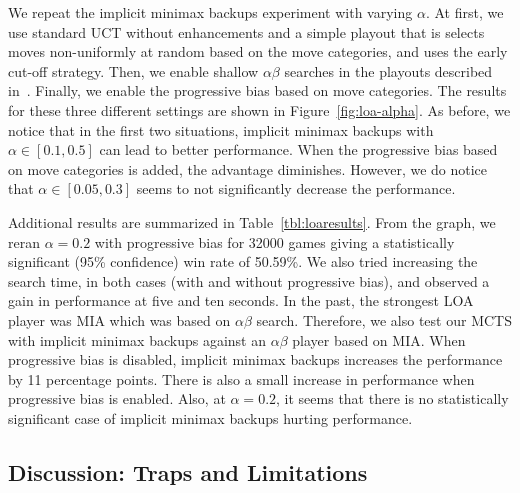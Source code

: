 \documentclass[conference]{IEEEtran}
\begin{document}
We repeat the implicit minimax backups experiment with varying $\alpha$. At first, we use standard UCT without enhancements 
and a simple playout that is selects moves non-uniformly at random based on the move categories, and uses the early cut-off strategy. 
Then, we enable shallow $\alpha \beta$ searches in the playouts described in~\cite{Winands11AB}. 
Finally, we enable the progressive bias based on move categories. The results for these 
three different settings are shown in Figure~\ref{fig:loa-alpha}. As before, we notice that in the first two situations,
implicit minimax backups with $\alpha \in [0.1,0.5]$ can lead to better performance. When the progressive bias based on move 
categories is added, the advantage diminishes. However, we do notice that $\alpha \in [0.05,0.3]$ seems to not significantly 
decrease the performance. 

Additional results are summarized in Table~\ref{tbl:loaresults}. From the graph, we reran $\alpha = 0.2$ with progressive bias for 
32000 games giving a statistically significant (95\% confidence) win rate of 50.59\%. 
We also tried increasing the search time, in both cases (with and without progressive bias), 
and observed a gain in performance at five and ten seconds. 
In the past, the strongest LOA player was MIA which was based on $\alpha \beta$ search. Therefore, we also test our MCTS with 
implicit minimax backups against an $\alpha \beta$ player based on MIA. When progressive bias is disabled, implicit minimax backups
increases the performance by 11 percentage points. There is also a small increase in performance when progressive bias is enabled. 
Also, at $\alpha = 0.2$, it seems that there is no statistically significant case of implicit minimax backups hurting performance. 

\subsection{Discussion: Traps and Limitations} 
\end{document}
